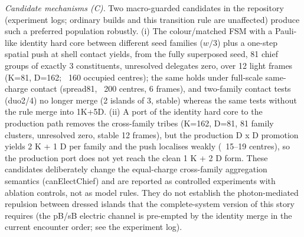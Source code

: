 \documentclass{ijuc}
\begin{document}
\emph{Candidate mechanisms (C).} Two macro-guarded candidates in the
repository (experiment logs; ordinary builds and this transition rule are
unaffected) produce such a preferred population robustly.  (i) The colour/matched FSM
with a Pauli-like identity hard core between different seed families
($w/3$) plus a one-step spatial push at shell contact yields, from the fully
superposed seed, 81 chief groups of exactly 3 constituents, unresolved
delegates zero, over 12 light frames (K=81, D=162; ~160 occupied centres);
the same holds under full-scale same-charge contact (spread81, ~200 centres,
6 frames), and two-family contact tests (duo2/4) no longer merge (2 islands
of 3, stable) whereas the same tests without the rule merge into 1K+5D.
(ii) A port of the identity hard core to the production path removes the
cross-family tribes (K=162, D=81, 81 family clusters, unresolved zero, stable
12 frames), but the production D x D promotion yields 2 K + 1 D per family
and the push localises weakly (~15--19 centres), so the production port does
not yet reach the clean 1 K + 2 D form.  These candidates deliberately change
the equal-charge cross-family aggregation semantics (canElectChief) and are
reported as controlled experiments with ablation controls, not as model
rules.  They do not establish the photon-mediated repulsion between dressed
islands that the complete-system version of this story requires (the pB/sB
electric channel is pre-empted by the identity merge in the current
encounter order; see the experiment log).
\end{document}
